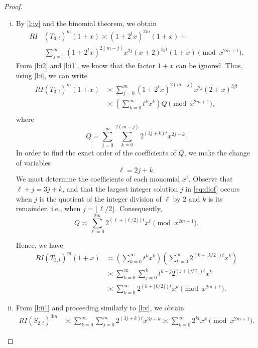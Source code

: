 \documentclass[reqno]{amsart}
\newcommand{\floor}[1]{\lfloor #1\rfloor}
\begin{document}
\begin{proof}
\begin{enumerate}[(i)]
\item By \eqref{l:iv} and  the binomial theorem,  we obtain
\begin{align*}
RI&(T_{3,t})^m (1+x)\asymp (1+2^tx)^{2m}(1+x)+\\
&\,\sum_{j=1}^m(1+2^tx)^{2(m-j)} x^{2j}(x+2)^{3jt}(1+x) \pmod{x^{2m+1}}.
\end{align*}
From \eqref{l:i2} and \eqref{l:i1}, we know that the factor $1+x$ can be ignored. Thus, using  \eqref{l:i}, we can write
\begin{align*}
RI(T_{3,t})^m (1+x)&\asymp \sum_{j=0}^m(1+2^tx)^{2(m-j)} x^{2j}(2+x)^{3jt}\\&
\asymp \left(\sum_{k=0}^\infty t^{k} x^k\right)Q \pmod{x^{2m+1}},\\
\end{align*}
where
\[
Q=\sum_{j=0}^m \sum_{k=0}^{2(m-j)}2^{(3j+k)t}x^{2j+k}.
\] In order to find the exact order of the coefficients of $Q$, we make the change of variables
\begin{equation}
  \label{eq:diof}
\ell=2j+k.  
\end{equation} 
We must determine the coefficients of each monomial $x^\ell$. Observe that $\ell + j = 3j + k$, and that the largest integer solution $j$ in \eqref{eq:diof} occurs when $j$ is the quotient of the integer division of $\ell$ by $2$ and $k$ is its remainder, i.e., when $j = \lfloor \ell/2 \rfloor$. Consequently,
\[
Q\asymp\sum_{\ell=0}^{2m}2^{(\ell+\floor{\ell/2})t}x^\ell\pmod{x^{2m+1}}.
\]



Hence, we have
\begin{align*}
RI(T_{3,t})^m (1+x)&\asymp \left(\sum_{k=0}^\infty t^k x^k\right)\left( \sum_{k=0}^\infty 2^{(k+\floor{k/2})t}x^k\right) \\
&\asymp \sum_{k=0}^\infty \sum_{j=0}^k t^{k-j}2^{(j+\floor{{j}/{2}})t}x^k\\
&\asymp \sum_{k=0}^{\infty} 2^{(k+\floor{k/2})t}x^k \pmod{x^{2m+1}}.
\end{align*}


\item From \eqref{l:ii1} and proceeding similarly to \eqref{l:v}, we obtain
\begin{align*}
RI(S_{2,t})^{3m}&\asymp \sum_{k=0}^{\infty}\sum_{j=0}^m 2^{(3j+k)t}x^{3j+k}\asymp\sum_{k=0}^\infty 2^{kt}x^k\pmod{x^{2m+1}}.
\end{align*}\end{enumerate}	
\end{proof}
\end{document}
